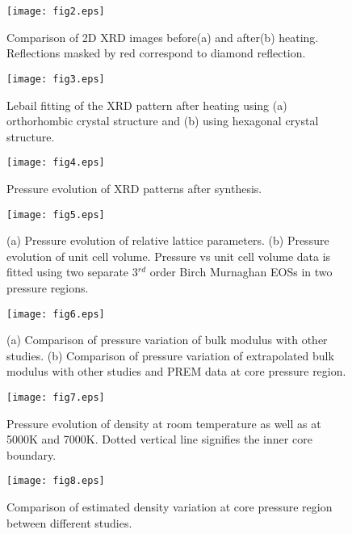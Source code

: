 \documentclass[prb,aps,preprint]{revtex4-2}
\begin{document}
\begin{figure}
	\centering
	\texttt{[image: fig2.eps]}
	\caption{\label{Fig.2} Comparison of 2D XRD images before(a) and after(b) heating. Reflections masked by red correspond to diamond reflection.}
\end{figure} 

\begin{figure}
	\centering
	\texttt{[image: fig3.eps]}
	\caption{\label{Fig.3} Lebail fitting of the XRD pattern after heating using (a) orthorhombic crystal structure and (b) using hexagonal crystal structure. }
\end{figure}

\begin{figure}
	\centering
	\texttt{[image: fig4.eps]}
	\caption{\label{Fig.4} Pressure evolution of XRD patterns after synthesis. }
\end{figure}

\begin{figure}
	\begin{center}
		\texttt{[image: fig5.eps]}
	\end{center}
	\caption{\label{Fig.5} (a) Pressure evolution of relative lattice parameters. (b) Pressure evolution of unit cell volume. Pressure vs unit cell volume data is fitted using two separate 3$^{rd}$ order Birch Murnaghan EOSs in two pressure regions. }
\end{figure}

\begin{figure}
	\centering
	\texttt{[image: fig6.eps]}
	\caption{\label{Fig.6} (a) Comparison of pressure variation of bulk modulus with other studies. (b) Comparison of pressure variation of extrapolated bulk modulus with other studies and PREM data at core pressure region.}
\end{figure}

\begin{figure}
	\centering
	\texttt{[image: fig7.eps]}
	\caption{\label{Fig.7} Pressure evolution of density at room temperature as well as at 5000K and 7000K. Dotted vertical line signifies the inner core boundary.}
\end{figure}

\begin{figure}
	\centering
	\texttt{[image: fig8.eps]}
	\caption{\label{Fig.8} Comparison of estimated density variation at core pressure region between different studies. }
\end{figure}
\end{document}
